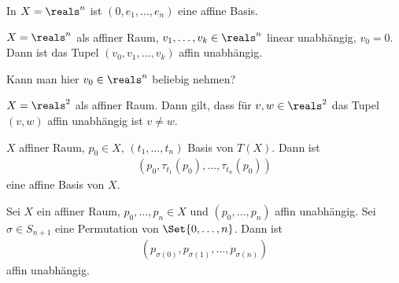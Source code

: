 \begin{beispiele*}
    \begin{eigenschaftenenumerate}
        \item In \( X=\reals^n \) ist \( (0,e_1,\dotsc, e_n) \) eine affine Basis.
        \item \( X=\reals^n \) als affiner Raum, \( v_1,\dotsc, v_k\in \reals^n \) linear unabhängig, \( v_0=0 \). Dann ist das Tupel \( (v_0,v_1,\dotsc,v_k) \) affin unabhängig.
        \begin{frage*}
            Kann man hier \( v_0\in \reals^n \) beliebig nehmen?
        \end{frage*}
        \item \( X=\reals^2 \) als affiner Raum. Dann gilt, dass für \( v,w\in \reals^2 \) das Tupel \( (v,w) \) affin unabhängig ist \gdw \( v\neq w \).
        \item \( X \) affiner Raum, \( p_0\in X \), \( (t_1,\dotsc,t_n) \) Basis von \( T(X) \). Dann ist
        \begin{align*}
            (p_0,\tau_{t_1}(p_0),\dotsc, \tau_{t_n}(p_0))
        \end{align*}
        eine affine Basis von \( X \).
    \end{eigenschaftenenumerate}
    
\end{beispiele*}
\begin{lemma}
    Sei \( X \) ein affiner Raum, \( p_0,\dotsc, p_n\in X \) und \( (p_0,\dotsc, p_n) \) affin unabhängig. Sei \( \sigma\in S_{n+1} \) eine Permutation von \( \Set{0,\dotsc,n} \). Dann ist
    \begin{align*}
        (p_{\sigma(0)},p_{\sigma(1)},\dotsc,p_{\sigma(n)})
    \end{align*}
    affin unabhängig.
\end{lemma}
